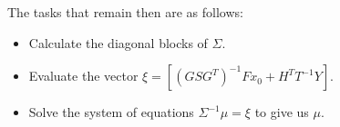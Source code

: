 \documentclass{article}
\begin{document}
The tasks that remain then are as follows:
\begin{itemize}
  \item Calculate the diagonal blocks of $\Sigma$.
  \item Evaluate the vector $\xi = \left[ (GSG^T)^{-1} F x_0 + H^T T^{-1} Y \right]$.
  \item Solve the system of equations $\Sigma^{-1} \mu = \xi$ to give us $\mu$.
\end{itemize}
\end{document}
